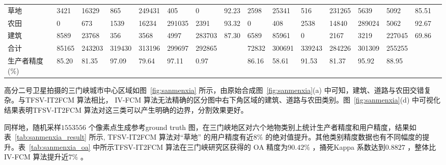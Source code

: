 \begin{table}[htbp]
{\begin{adjustbox}{max width=1.15\textwidth}
\begin{tabular} {llllllllllllllll}
            草地                                          & 3421                                     & 16329                                             & 865                        & 249431                                            & 405    & 0      & 92.23 & 2598  & 25341  & 516    & 231265 & 5639   & 5092   & 85.51 \\
            农田                                          & 0                                        & 673                                               & 1539                       & 16234                                             & 291035 & 2391   & 93.32 & 0     & 408    & 2538   & 14840  & 289024 & 5062   & 92.67 \\
            建筑                                          & 8589                                     & 23768                                             & 356                        & 3568                                              & 4997   & 283703 & 87.30 & 6589  & 85961  & 0      & 2167   & 3219   & 227045 & 69.86 \\
            合计                                          & 85165                                    & 243203                                            & 319430                     & 313196                                            & 299697 & 292865 &       & 72832 & 300691 & 339243 & 284226 & 301309 & 255255 &       \\
            生产者精度(\%)                                & 85.20                                    & 81.35                                             & 97.09                      & 79.64                                             & 97.11  & 0.97   &       & 86.16 & 58.61  & 91.53  & 81.37  & 95.92  & 88.95  &       \\
            \bottomrule
        \end{tabular}
    \end{adjustbox}}
\end{table}

高分二号卫星拍摄的三门峡城市中心区域如图~\ref{fig:sanmenxia} 所示，由原始合成图~\ref{fig:sanmenxia}(a) 中可知，建筑、道路与农田交错复杂。与TFSV-IT2FCM 算法相比， IV-FCM 算法无法精确的区分图中右下角区域的建筑、道路与农田类别。图~\ref{fig:sanmenxia}(d) 中可视化结果表明TFSV-IT2FCM 算法对这三类可以产生明确的边界，分割效果更好。

同样地，随机采样$1553556$ 个像素点生成参考ground truth 图，在三门峡地区对六个地物类别上统计生产者精度和用户精度，结果如表~\ref{tab:sanmenxia_result} 所示, TFSV-IT2FCM 算法对“草地” 的用户精度有近$8\%$ 的绝对值提升。其他类别精度数据也有不同幅度的提升。表~\ref{tab:sanmenxia_oa} 中所示TFSV-IT2FCM 算法在三门峡研究区获得的 OA 精度为$90.42\%$ ，捅死Kappa 系数达到$0.8827$ ，整体比IV-FCM 算法提升近$7\%$ 。

